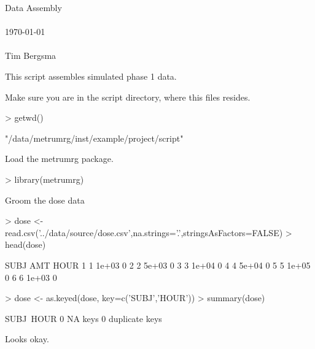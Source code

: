 
\usepackage{Sweave}

 

\vspace*{2cm}
\begin{center}
\vspace{1.5cm}
{\Large Data Assembly}\\
~\\
\today\\
~\\
Tim Bergsma\\
\end{center}
\newpage

This script assembles simulated phase 1 data.

Make sure you are in the script directory, where this files resides.
\begin{Schunk}
\begin{Sinput}
> getwd()
\end{Sinput}
\begin{Soutput}
[1] "/data/metrumrg/inst/example/project/script"
\end{Soutput}
\end{Schunk}
Load the metrumrg package.
\begin{Schunk}
\begin{Sinput}
> library(metrumrg)
\end{Sinput}
\end{Schunk}
Groom the dose data
\begin{Schunk}
\begin{Sinput}
> dose <- read.csv('../data/source/dose.csv',na.strings='.',stringsAsFactors=FALSE)
> head(dose)
\end{Sinput}
\begin{Soutput}
  SUBJ   AMT HOUR
1    1 1e+03    0
2    2 5e+03    0
3    3 1e+04    0
4    4 5e+04    0
5    5 1e+05    0
6    6 1e+03    0
\end{Soutput}
\begin{Sinput}
> dose <- as.keyed(dose, key=c('SUBJ','HOUR'))
> summary(dose)
\end{Sinput}
\begin{Soutput}
SUBJ~HOUR
0 NA keys
0 duplicate keys
\end{Soutput}
\end{Schunk}
Looks okay.

